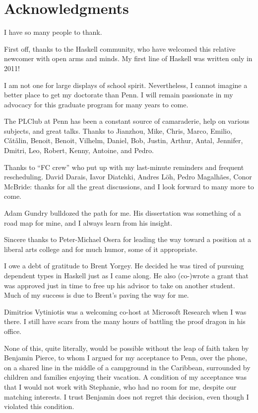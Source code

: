 \chapter*{Acknowledgments}

I have so many people to thank.

First off, thanks to the Haskell community, who have welcomed this
relative newcomer with open arms and minds. My first line of Haskell
was written only in 2011!

I am not one for large displays of school spirit. Nevertheless,
I cannot imagine a better place to get my doctorate than Penn.
I will remain passionate in my advocacy for this graduate program
for many years to come.

The PLClub at Penn has been a constant source of camaraderie, help
on various subjects, and great talks. Thanks to Jianzhou, Mike, Chris,
Marco, Emilio, C\v{a}t\v{a}lin, Benoit, Benoit,
Vilhelm, Daniel, Bob, Justin, Arthur, Antal, Jennifer, Dmitri,
Leo, Robert, Kenny, Antoine, and Pedro.

Thanks to ``FC crew'' who put up with my last-minute reminders and
frequent rescheduling. David Darais, Iavor Diatchki,
 Andres L\"{o}h, Pedro Magalh\~{a}es, Conor McBride: thanks for all the great
discussions, and I look forward to many more to come.

Adam Gundry bulldozed the path for me. His dissertation was something of
a road map for mine, and I always learn from his insight.

Sincere thanks to Peter-Michael Osera for leading the way toward
a position at a liberal arts college and for much humor, some of
it appropriate.

I owe a debt of gratitude to Brent Yorgey. He decided he was tired
of pursuing dependent types in Haskell just as I came along. He also
(co-)wrote a grant that was approved just in time to free up his
advisor to take on another student. Much of my success is due to
Brent's paving the way for me.

Dimitrios Vytiniotis was a welcoming co-host at Microsoft Research
when I was there. I still have scars from the many hours of battling the
proof dragon in his office.

None of this, quite literally, would be possible without the leap
of faith taken by Benjamin Pierce, to whom I argued for my acceptance
to Penn, over the phone, on a shared line in the middle of a campground
in the Caribbean, surrounded by children and families enjoying
their vacation. A condition of my acceptance was that I would not work
with Stephanie, who had no room for me, despite our matching interests.
I trust Benjamin does not regret this decision, even though I violated
this condition.

